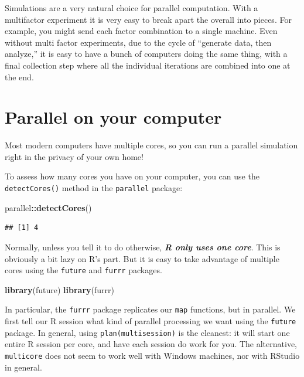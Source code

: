 \documentclass[
]{book}
\newenvironment{Shaded}{\begin{snugshade}}{\end{snugshade}}
\newcommand{\FunctionTok}[1]{\textcolor[rgb]{0.13,0.29,0.53}{\textbf{#1}}}
\newcommand{\NormalTok}[1]{#1}
\newcommand{\SpecialCharTok}[1]{\textcolor[rgb]{0.81,0.36,0.00}{\textbf{#1}}}
\begin{document}
Simulations are a very natural choice for parallel computation.
With a multifactor experiment it is very easy to break apart the overall into pieces.
For example, you might send each factor combination to a single machine.
Even without multi factor experiments, due to the cycle of ``generate data, then analyze,'' it is easy to have a bunch of computers doing the same thing, with a final collection step where all the individual iterations are combined into one at the end.

\section{Parallel on your computer}\label{parallel-on-your-computer}

Most modern computers have multiple cores, so you can run a parallel simulation right in the privacy of your own home!

To assess how many cores you have on your computer, you can use the \texttt{detectCores()} method in the \texttt{parallel} package:

\begin{Shaded}
\begin{Highlighting}[]
\NormalTok{parallel}\SpecialCharTok{::}\FunctionTok{detectCores}\NormalTok{()}
\end{Highlighting}
\end{Shaded}

\begin{verbatim}
## [1] 4
\end{verbatim}

Normally, unless you tell it to do otherwise, \textbf{\emph{R only uses one core}}.
This is obviously a bit lazy on R's part.
But it is easy to take advantage of multiple cores using the \texttt{future} and \texttt{furrr} packages.

\begin{Shaded}
\begin{Highlighting}[]
\FunctionTok{library}\NormalTok{(future)}
\FunctionTok{library}\NormalTok{(furrr)}
\end{Highlighting}
\end{Shaded}

In particular, the \texttt{furrr} package replicates our \texttt{map} functions, but in parallel.
We first tell our R session what kind of parallel processing we want using the \texttt{future} package.
In general, using \texttt{plan(multisession)} is the cleanest: it will start one entire R session per core, and have each session do work for you.
The alternative, \texttt{multicore} does not seem to work well with Windows machines, nor with RStudio in general.
\end{document}
